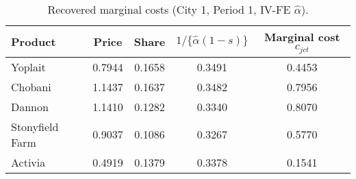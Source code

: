 \begin{table}[H]
\centering
\caption{Recovered marginal costs (City 1, Period 1, IV-FE $\hat\alpha$).}
\label{tab:q14_mc_c1t1}
\begin{tabular}{lcccc}
\toprule
Product & Price & Share & $1/\{\hat\alpha(1-s)\}$ & Marginal cost $c_{jct}$ \\
\midrule
Yoplait & 0.7944 & 0.1658 & 0.3491 & 0.4453 \\
Chobani & 1.1437 & 0.1637 & 0.3482 & 0.7956 \\
Dannon & 1.1410 & 0.1282 & 0.3340 & 0.8070 \\
Stonyfield Farm & 0.9037 & 0.1086 & 0.3267 & 0.5770 \\
Activia & 0.4919 & 0.1379 & 0.3378 & 0.1541 \\
\bottomrule
\end{tabular}
\end{table}
